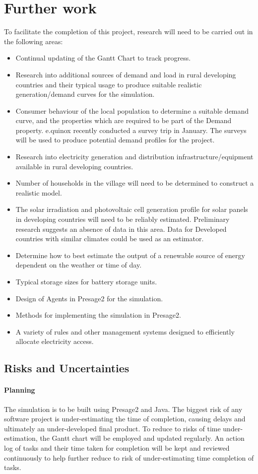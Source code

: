 \documentclass{article}
\begin{document}
\section{Further work}
To facilitate the completion of this project, research will need to be carried out in the following areas:
\begin{itemize}
\item Continual updating of the Gantt Chart to track progress.
\item Research into additional sources of demand and load in rural developing countries and their typical usage to produce suitable realistic generation/demand curves for the simulation.
\item Consumer behaviour of the local population to determine a suitable demand curve, and the properties which are required to be part of the Demand property. e.quinox recently conducted a survey trip in January. The surveys will be used to produce potential demand profiles for the project.
\item Research into electricity generation and distribution infrastructure/equipment available in rural developing countries.
\item Number of households in the village will need to be determined to construct a realistic model.
\item The solar irradiation and photovoltaic cell generation profile for solar panels in developing countries will need to be reliably estimated. Preliminary research suggests an absence of data in this area. Data for Developed countries with similar climates could be used as an estimator.
\item Determine how to best estimate the output of a renewable source of energy dependent on the weather or time of day.
\item Typical storage sizes for battery storage units.
\item Design of Agents in Presage2 for the simulation.
\item Methods for implementing the simulation in Presage2.
\item A variety of rules and other management systems designed to efficiently allocate electricity access.
\end{itemize}

\subsection{Risks and Uncertainties}
\paragraph{Planning}
The simulation is to be built using Presage2 and Java. The biggest risk of any software project is under-estimating the time of completion, causing delays and ultimately an under-developed final product. To reduce to risks of time under-estimation, the Gantt chart will be employed and updated regularly. An action log of tasks and their time taken for completion will be kept and reviewed continuously to help further reduce to risk of under-estimating time completion of tasks. 
\end{document}
